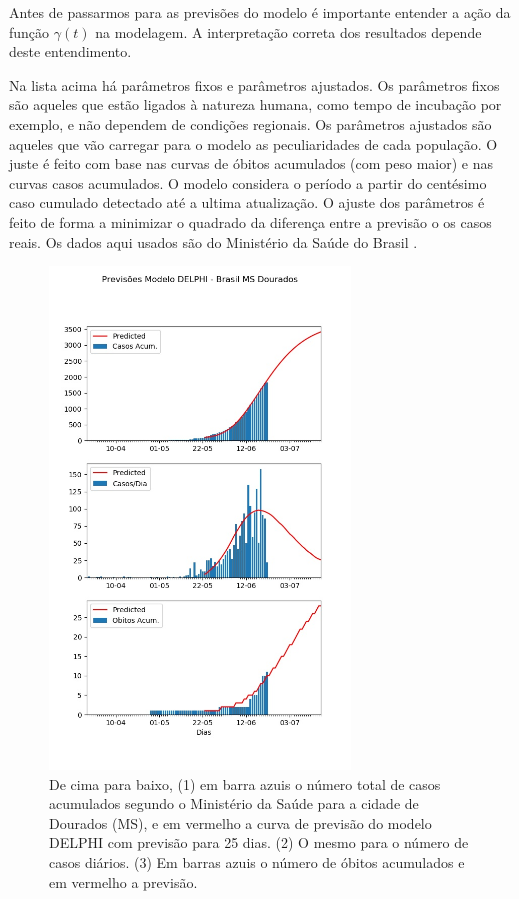 \documentclass[12pt]{article}
\begin{document}
Antes de passarmos para as previsões do modelo é importante entender a ação da função $\gamma(t)$ na modelagem. A interpretação correta dos resultados depende deste entendimento.

    Na lista acima há parâmetros fixos e parâmetros ajustados. Os parâmetros fixos são aqueles que estão ligados à natureza humana, como tempo de incubação por exemplo, e não dependem de condições regionais. Os parâmetros ajustados são aqueles que vão carregar para o modelo as peculiaridades de cada população. O juste é feito com base nas curvas de óbitos acumulados (com peso maior) e nas curvas casos acumulados. O modelo considera o período a partir do centésimo caso cumulado detectado até a ultima atualização. O ajuste dos parâmetros é feito de forma a minimizar o quadrado da diferença entre a previsão o os casos reais. Os dados aqui usados são do Ministério da Saúde do Brasil \cite{minsaude}.
    
    \begin{figure}[!htb]
     \centering
     \includegraphics[width = 8cm]{figs/Fig_Brasil_MS_DouradosFCol_20200623.jpg}
     \caption{De cima para baixo, (1) em barra azuis o número total de casos acumulados segundo o Ministério da Saúde para a cidade de Dourados (MS), e em vermelho a curva de previsão do modelo DELPHI com previsão para 25 dias. (2) O mesmo para o número de casos diários. (3) Em barras azuis o número de óbitos acumulados e em vermelho a previsão.}
     \label{proj_set}
    \end{figure}
\end{document}
